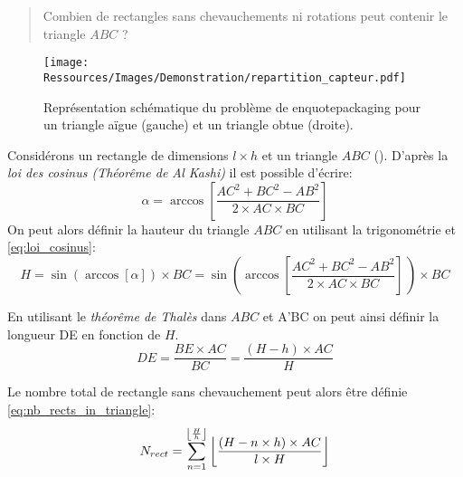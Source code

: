 

\blockquote{Combien de rectangles sans chevauchements ni rotations peut contenir le triangle $ABC$ ?}

\begin{figure}
    \begin{center}
        \texttt{[image: Ressources/Images/Demonstration/repartition\_capteur.pdf]}
    \end{center}
    \caption{Représentation schématique du problème de enquote{packaging} pour
             un triangle aïgue (gauche) et un triangle obtue (droite).
             \label{fig:rects_in_triangle}}
\end{figure}

Considérons un rectangle de dimensions $l \times h$ et un triangle $ABC$ ().
D’après la \textit{loi des cosinus (Théorême de Al Kashi)} il est possible d’écrire:
\begin{equation}
        \alpha = \arccos \left[\frac{AC^{2} + BC^{2} - AB^{2}}{2 \times AC \times BC}\right]
    \label{eq:loi_cosinus}
\end{equation}
\noindent On peut alors définir la hauteur du triangle $ABC$ en utilisant la trigonométrie et
\eqref{eq:loi_cosinus}:
\begin{equation}
        H = \sin (\arccos[\alpha]) \times BC%
          =\sin \left(\arccos \left[\frac{AC^{2} + BC^{2} - AB^{2}}{2 \times AC \times BC}\right]\,\right) \times BC
    \label{fig:height_triangle}
\end{equation}

\noindent En utilisant le \textit{théorême de Thalès} dans $ABC$ et A’BC on peut ainsi définir la longueur DE
en fonction de $H$.
\begin{equation}
    DE = \frac{BE \times AC}{BC} = \frac{(H - h) \times AC}{H}
\end{equation}

\noindent Le nombre total de rectangle sans chevauchement peut alors être définie \eqref{eq:nb_rects_in_triangle}:
\begin{equation}
    N_{rect} = \sum_{n = 1}^{\floor*{\frac{H}{h}}} \, \floor*{\frac{(H - n \times h) \times AC}{l \times H}}
    \label{eq:nb_rects_in_triangle}
\end{equation}
